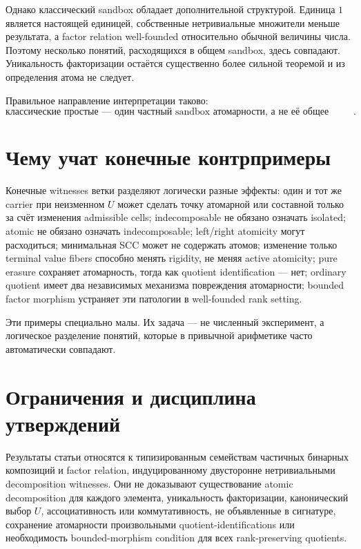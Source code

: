 \documentclass[11pt]{article}
\theoremstyle{definition}
\theoremstyle{remark}
\begin{document}
Однако классический sandbox обладает дополнительной структурой. Единица \(1\) является настоящей единицей, собственные нетривиальные множители меньше результата, а factor relation well-founded относительно обычной величины числа. Поэтому несколько понятий, расходящихся в общем sandbox, здесь совпадают. Уникальность факторизации остаётся существенно более сильной теоремой и из определения атома не следует.

Правильное направление интерпретации таково:
\[
\boxed{\text{классические простые — один частный sandbox атомарности, а не её общее определение}.}
\]

\section{Чему учат конечные контрпримеры}

Конечные witnesses ветки разделяют логически разные эффекты: один и тот же carrier при неизменном \(U\) может сделать точку атомарной или составной только за счёт изменения admissible cells; indecomposable не обязано означать isolated; atomic не обязано означать indecomposable; left/right atomicity могут расходиться; минимальная SCC может не содержать атомов; изменение только terminal value fibers способно менять rigidity, не меняя active atomicity; pure erasure сохраняет атомарность, тогда как quotient identification — нет; ordinary quotient имеет два независимых механизма повреждения атомарности; bounded factor morphism устраняет эти патологии в well-founded rank setting.

Эти примеры специально малы. Их задача — не численный эксперимент, а логическое разделение понятий, которые в привычной арифметике часто автоматически совпадают.

\section{Ограничения и дисциплина утверждений}

Результаты статьи относятся к типизированным семействам частичных бинарных композиций и factor relation, индуцированному двусторонне нетривиальными decomposition witnesses. Они не доказывают существование atomic decomposition для каждого элемента, уникальность факторизации, канонический выбор \(U\), ассоциативность или коммутативность, не объявленные в сигнатуре, сохранение атомарности произвольными quotient-identifications или необходимость bounded-morphism condition для всех rank-preserving quotients.
\end{document}
